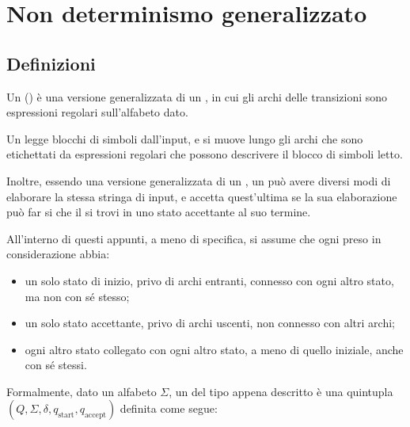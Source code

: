 \documentclass[a4paper, 12pt]{report}
\begin{document}
    \section{Non determinismo generalizzato}

    \subsection{Definizioni}
    
    \begin{frameddefn}[label={def gnfa}]{\GNFA}
        Un \tbf{\GNFA} () è una versione generalizzata di un \NFA, in cui gli archi delle transizioni sono espressioni regolari sull'alfabeto dato.

        Un \GNFA legge blocchi di simboli dall'input, e si muove lungo gli archi che sono etichettati da espressioni regolari che possono descrivere il blocco di simboli letto.

        Inoltre, essendo una versione generalizzata di un \NFA, un \GNFA può avere diversi modi di elaborare la stessa stringa di input, e accetta quest'ultima se la sua elaborazione può far si che il \GNFA si trovi in uno stato accettante al suo termine.

         All'interno di questi appunti, a meno di specifica, si assume che ogni \GNFA preso in considerazione abbia:

        \begin{itemize}
            \item un solo stato di inizio, privo di archi entranti, connesso con ogni altro stato, ma non con sé stesso;
            \item un solo stato accettante, privo di archi uscenti, non connesso con altri archi;
            \item ogni altro stato collegato con ogni altro stato, a meno di quello iniziale, anche con sé stessi.
        \end{itemize}

        Formalmente, dato un alfabeto $\Sigma$, un \GNFA del tipo appena descritto è una quintupla $(Q, \Sigma, \delta, q_{\mathrm{start}}, q_{\mathrm{accept}})$ definita come segue:


\end{frameddefn}
\end{document}
